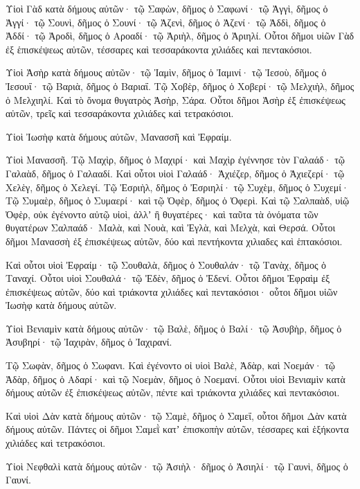 {\par }{\PP {}Υἱοὶ Γὰδ κατὰ δήμους αὐτῶν· τῷ Σαφὼν, δῆμος ὁ Σαφωνί· τῷ Ἀγγὶ, δῆμος ὁ Ἀγγί· τῷ Σουνὶ, δῆμος ὁ Σουνί·
τῷ Ἀζενὶ, δῆμος ὁ Ἀζενί· τῷ Ἀδδὶ, δῆμος ὁ Ἀδδί·
τῷ Ἀροδὶ, δῆμος ὁ Αροαδί· τῷ Ἀριὴλ, δῆμος ὁ Ἀριηλί.
Οὗτοι δῆμοι υἱῶν Γὰδ ἐξ ἑπισκέψεως αὐτῶν, τέσσαρες καὶ τεσσαράκοντα χιλιάδες καὶ πεντακόσιοι.
\par }{\PP {}Υἱοὶ Ἀσὴρ κατὰ δήμους αὐτῶν· τῷ Ἰαμὶν, δῆμος ὁ Ἰαμινί· τῷ Ἰεσοὺ, δῆμος ὁ Ἰεσουΐ· τῷ Βαριὰ, δῆμος ὁ Βαριαΐ.
Τῷ Χοβὲρ, δῆμος ὁ Χοβερί· τῷ Μελχιὴλ, δῆμος ὁ Μελχιηλί.
Καὶ τὸ ὄνομα θυγατρὸς Ἀσὴρ, Σάρα.
Οὗτοι δῆμοι Ἀσὴρ ἐξ ἐπισκέψεως αὐτῶν, τρεῖς καὶ τεσσαράκοντα χιλιάδες καὶ τετρακόσιοι.
\par }{\PP {}Υἱοὶ Ἰωσὴφ κατὰ δήμους αὐτῶν, Μανασσῆ καὶ Ἐφραίμ.
\par }{\PP {}Υἱοὶ Μανασσῆ. Τῷ Μαχὶρ, δῆμος ὁ Μαχιρί· καὶ Μαχὶρ ἐγέννησε τὸν Γαλαάδ· τῷ Γαλαὰδ, δῆμος ὁ Γαλααδί.
Καὶ οὗτοι υἱοὶ Γαλαάδ· Ἀχιέζερ, δῆμος ὁ Ἀχιεζερί· τῷ Χελὲγ, δῆμος ὁ Χελεγί.
Τῷ Ἐσριὴλ, δῆμος ὁ Ἐσριηλί· τῷ Συχὲμ, δῆμος ὁ Συχεμί·
Τῷ Συμαὲρ, δῆμος ὁ Συμαερί· καὶ τῷ Ὀφὲρ, δῆμος ὁ Ὀφερὶ.
Καὶ τῷ Σαλπαὰδ, υἱῷ Ὀφὲρ, οὐκ ἐγένοντο αὐτῷ υἱοὶ, ἀλλʼ ἢ θυγατέρες· καὶ ταῦτα τὰ ὀνόματα τῶν θυγατέρων Σαλπαάδ· Μαλὰ, καὶ Νουὰ, καὶ Ἐγλὰ, καὶ Μελχὰ, καὶ Θερσά.
Οὗτοι δῆμοι Μανασσὴ ἐξ ἐπισκέψεως αὐτῶν, δύο καὶ πεντήκοντα χιλιαδες καὶ ἑπτακόσιοι.
\par }{\PP {}Καὶ οὗτοι υἱοὶ Ἐφραίμ· τῷ Σουθαλὰ, δῆμος ὁ Σουθαλάν· τῷ Τανὰχ, δῆμος ὁ Ταναχί.
Οὗτοι υἱοὶ Σουθαλά· τῷ Ἐδὲν, δῆμος ὁ Ἐδενί.
Οὗτοι δῆμοι Ἐφραὶμ ἐξ ἐπισκέψεως αὐτῶν, δύο καὶ τριάκοντα χιλιάδες καὶ πεντακόσιοι· οὗτοι δῆμοι υἱῶν Ἰωσὴφ κατὰ δήμους αὐτῶν.
\par }{\PP {}Υἱοὶ Βενιαμὶν κατὰ δήμους αὐτῶν· τῷ Βαλὲ, δῆμος ὁ Βαλί· τῷ Ἀσυβὴρ, δῆμος ὁ Ἀσυβηρί· τῷ Ἰαχιρὰν, δῆμος ὁ Ἰαχιρανί.
\par }{\PP {}Τῷ Σωφὰν, δῆμος ὁ Σωφανι.
Καὶ ἐγένοντο οἱ υἱοὶ Βαλὲ, Ἀδὰρ, καὶ Νοεμάν· τῷ Ἀδὰρ, δῆμος ὁ Αδαρί· καὶ τῷ Νοεμὰν, δῆμος ὁ Νοεμανί.
Οὗτοι υἱοὶ Βενιαμὶν κατὰ δήμους αὐτῶν ἐξ ἐπισκέψεως αὐτῶν, πέντε καὶ τριάκοντα χιλιάδες καὶ πεντακόσιοι.
\par }{\PP {}Καὶ υἱοὶ Δὰν κατὰ δήμους αὐτῶν· τῷ Σαμὲ, δῆμος ὁ Σαμεΐ, οὗτοι δῆμοι Δὰν κατὰ δήμους αὐτῶν.
Πάντες οἱ δῆμοι Σαμεῒ κατʼ ἐπισκοπὴν αὐτῶν, τέσσαρες καὶ ἑξήκοντα χιλιάδες καὶ τετρακόσιοι.
\par }{\PP {}Υἱοὶ Νεφθαλὶ κατὰ δήμους αὐτῶν· τῷ Ἀσιὴλ· δῆμος ὁ Ἀσιηλί· τῷ Γαυνὶ, δῆμος ὁ Γαυνί.
}
